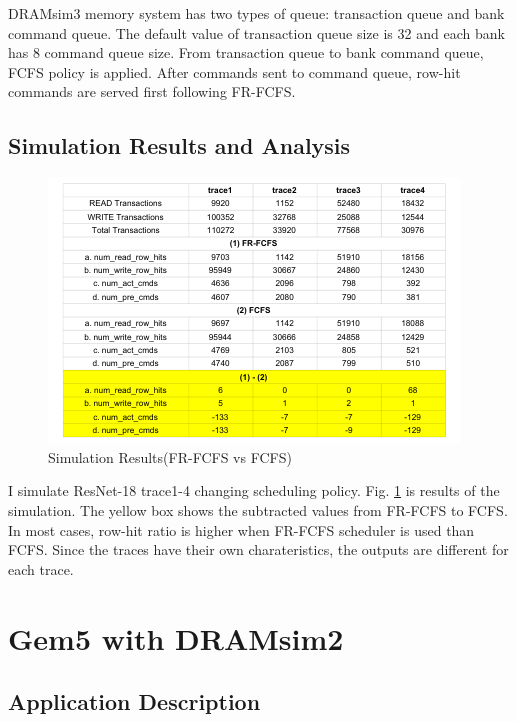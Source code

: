 \documentclass[conference]{IEEEtran}
\begin{document}


DRAMsim3 memory system has two types of queue: transaction queue and bank command queue. 
The default value of transaction queue size is 32 and each bank has 8 command queue size.
From transaction queue to bank command queue, FCFS policy is applied. 
After commands sent to command queue, row-hit commands are served first following FR-FCFS.   

\subsection{Simulation Results and Analysis}

\begin{figure}
    \centering
    \includegraphics[width=1.00\linewidth]{image/dramsim3_1.pdf}
	\caption{Simulation Results(FR-FCFS vs FCFS)}
    \label{fig:simulation_result}
\end{figure}

I simulate ResNet-18 trace1-4 changing scheduling policy.
Fig. \ref{fig:simulation_result} is results of the simulation. 
The yellow box shows the subtracted values from FR-FCFS to FCFS.  
In most cases, row-hit ratio is higher when FR-FCFS scheduler is used than FCFS.
Since the traces have their own charateristics, the outputs are different for each trace.  

\section{Gem5 with DRAMsim2} \label{sec:gem5}
\subsection{Application Description}


\end{document}
